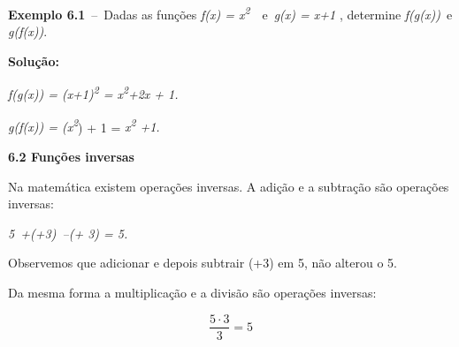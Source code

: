 \documentclass[12pt]{article}
\begin{document}
\begin{enumerate}[label*={\fontsize{14pt}{14pt}\selectfont \textbf{\arabic*.}}]
\begin{adjustwidth}{0.89in}{0.0in}
\end{adjustwidth}


\vspace{\baselineskip}
\begin{justify}
\textbf{Exemplo 6.1}\ –\ Dadas as funções   \textit{f(x) = x\textsuperscript{2}}\ \  e\  \textit{g(x) = x+1} , determine \textit{f(g(x))}\ e  \textit{g(f(x))}.
\end{justify}\par

\begin{justify}
\textbf{Solução: }
\end{justify}\par

\begin{justify}
\textit{f(g(x)) = (x+1)\textsuperscript{2} = x\textsuperscript{2}+2x + 1.}
\end{justify}\par

\begin{justify}
\textit{g(f(x)) = (x\textsuperscript{2}}) + 1 = \textit{x\textsuperscript{2} +1.}
\end{justify}\par


\vspace{\baselineskip}
\begin{justify}
\textbf{6.2 Funções inversas }
\end{justify}\par

Na matemática existem operações inversas. A adição e a subtração são operações inversas:\par


\vspace{\baselineskip}
\textit{5\ +(+3)\ –(+ 3) = 5.   }\par


\vspace{\baselineskip}
Observemos que adicionar e depois subtrair (+3) em 5, não alterou o 5. \par

Da mesma forma a multiplicação e a divisão são operações inversas:\par

\tab  \par

\begin{adjustwidth}{0.98in}{0.0in}
 \[  \]  \[ \frac{5 \cdot 3}{3}=5 \] \par

\end{adjustwidth}


\end{enumerate}
\end{document}
